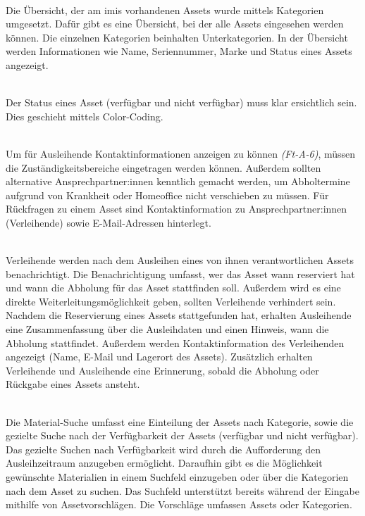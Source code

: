     {\sffamily\color{maincolor}{Ft-VA-2 | Übersicht über ausleihbare Assets }}\\
Die Übersicht, der am \ac{imis} vorhandenen Assets wurde mittels Kategorien
umgesetzt. Dafür gibt es eine Übersicht, bei der alle Assets eingesehen werden
können. Die einzelnen Kategorien beinhalten Unterkategorien. In der Übersicht
werden Informationen wie Name, Seriennummer, Marke und Status eines Assets
angezeigt.

    {\sffamily\color{maincolor}{Ft-VA-3 |  Verfügbarkeit von Assets }}\\
Der Status eines Asset (verfügbar und nicht verfügbar) muss klar ersichtlich
sein. Dies geschieht mittels Color-Coding.  


{\sffamily\color{maincolor}{Ft-VA-4 | Zuständigkeitsbereich }}\\
Um für Ausleihende Kontaktinformationen anzeigen zu können \textit{(Ft-A-6)},
müssen die Zuständigkeitsbereiche eingetragen werden können. Außerdem sollten
alternative Ansprechpartner:innen kenntlich gemacht werden, um Abholtermine
aufgrund von Krankheit oder Homeoffice nicht verschieben zu müssen. Für
Rückfragen zu einem Asset sind Kontaktinformation zu Ansprechpartner:innen
(Verleihende) sowie E-Mail-Adressen hinterlegt.

    {\sffamily\color{maincolor}{Ft-VA-5 | Benachrichtigungen \& Erinnerungen
        }}\\
Verleihende werden nach dem Ausleihen eines von ihnen verantwortlichen Assets
benachrichtigt. Die Benachrichtigung umfasst, wer das Asset wann reserviert hat
und wann die Abholung für das Asset stattfinden soll. Außerdem wird es eine
direkte Weiterleitungsmöglichkeit geben, sollten Verleihende verhindert sein.
Nachdem die Reservierung eines Assets stattgefunden hat, erhalten Ausleihende
eine Zusammenfassung über die Ausleihdaten und einen Hinweis, wann die Abholung
stattfindet. Außerdem werden Kontaktinformation des Verleihenden angezeigt
(Name, E-Mail und Lagerort des Assets). Zusätzlich erhalten Verleihende und
Ausleihende eine Erinnerung, sobald die Abholung oder Rückgabe eines Assets
ansteht.


    {\sffamily\color{maincolor}{Ft-VA-6 | Material-Suche }}\\
Die Material-Suche umfasst eine Einteilung der Assets nach Kategorie, sowie die
gezielte Suche nach der Verfügbarkeit der Assets (verfügbar und nicht
verfügbar). Das gezielte Suchen nach Verfügbarkeit wird durch die Aufforderung
den Ausleihzeitraum anzugeben ermöglicht. Daraufhin gibt es die Möglichkeit
gewünschte Materialien in einem Suchfeld einzugeben oder über die Kategorien
nach dem Asset zu suchen. Das Suchfeld unterstützt bereits während der Eingabe
mithilfe von Assetvorschlägen. Die Vorschläge umfassen Assets oder Kategorien.

